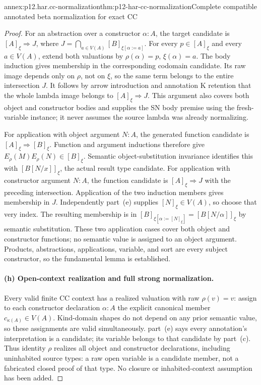 \begin{annexitem}{annex:p12.har.cc-normalization}{thm:p12-har-cc-normalization}{Complete compatible annotated beta normalization for exact CC}
\begin{proof}
For an abstraction over a constructor \(\alpha:A\), the target
candidate is \([A]_\xi\Rightarrow J\), where
\(J=\bigcap_{a\in V(A)}[B]_{\xi[\alpha:=a]}\).
For every \(p\in[A]_\xi\) and every \(a\in V(A)\), extend both
valuations by \(\rho(\alpha)=p\), \(\xi(\alpha)=a\).
The body induction gives membership in the corresponding codomain
candidate. Its raw image depends only on \(\rho\), not on \(\xi\),
so the same term belongs to the entire intersection \(J\). It follows
by arrow introduction and annotation K retention that the whole lambda
image belongs to \([A]_\xi\Rightarrow J\). This argument also
covers both object and constructor bodies and supplies the SN body
premise using the fresh-variable instance; it never assumes the source
lambda was already normalizing.

For application with object argument \(N:A\), the generated function
candidate is \([A]_\xi\Rightarrow[B]_\xi\). Function and argument
inductions therefore give \(E_\rho(M)E_\rho(N)\in[B]_\xi\).
Semantic object-substitution invariance identifies this with
\([B[N/x]]_\xi\), the actual result type candidate.
For application with constructor argument \(N:A\), the function
candidate is \([A]_\xi\Rightarrow J\) with the preceding
intersection. Application of the two induction members gives membership
in \(J\). Independently part~(e) supplies \([N]_\xi\in V(A)\), so choose
that very index. The resulting membership is in
\([B]_{\xi[\alpha:=[N]_\xi]}=[B[N/\alpha]]_\xi\) by semantic
substitution. These two application cases cover both object and
constructor functions; no semantic value is assigned to an object
argument. Products, abstractions, applications, variable, and sort are
every subject constructor, so the fundamental lemma is established.

\paragraph{(h) Open-context realization and full strong normalization.}
Every valid finite CC context has a realized valuation with raw
\(\rho(v)=v\): assign to each constructor declaration
\(\alpha:A\) the explicit canonical member
\(c_{\kappa(A)}\in V(A)\). Kind-domain shapes do not depend on any
prior semantic value, so these assignments are valid simultaneously.
part~(e) says every annotation's interpretation is a candidate; its variable
belongs to that candidate by part~(c). Thus identity \(\rho\) realizes
all object and constructor declarations, including uninhabited source
types: a raw open variable is a candidate member, not a fabricated
closed proof of that type. No closure or inhabited-context assumption
has been added.


\end{proof}
\end{annexitem}
